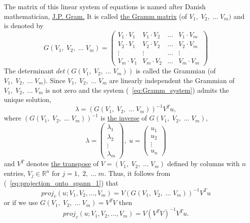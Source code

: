 \documentclass[color=black,11pt]{elegantpaper}
\begin{document}
The matrix of this linear system of equations is named after Danish mathematician, \href{https://en.wikipedia.org/wiki/J%C3%B8rgen_Pedersen_Gram}{J.P. Gram.} It is called \href{https://en.wikipedia.org/wiki/Gram_matrix}{the Gramm matrix} (of $V_1,\;V_2,\; \dots \; V_m)$ and is denoted by
$$
 G(V_1,\;V_2,\; \dots \; V_m) = \left(\begin{array}{cccc}
             V_1 \cdot V_1 & V_1 \cdot V_2 & \dots & V_1 \cdot V_m\\
             V_2 \cdot V_1 & V_2 \cdot V_2 & \dots & V_2 \cdot V_m\\
             \vdots & \vdots & \dots &\vdots \\
             V_m \cdot V_1 & V_m \cdot V_2 & \dots & V_m \cdot V_m
      \end{array}  \right)
$$
The determinant $det( G(V_1,\;V_2,\; \dots \; V_m))$ is called the Grammian (of $V_1,\;V_2,\; \dots \; V_m).$ Since $V_1,\;V_2,\; \dots \; V_m$ are linearly independent the Grammian of  $V_1,\;V_2,\; \dots \; V_m$ is not zero and the system (~\ref{eq:Gramm_system}) admits the unique solution,
$$
   \lambda = (G(V_1,\;V_2,\; \dots \; V_m))^{-1} V^T u,
$$ 
where $(G(V_1,\;V_2,\; \dots \; V_m))^{-1}$ is \href{https://en.wikipedia.org/wiki/Invertible_matrix}{the inverse} of $G(V_1,\;V_2,\; \dots \; V_m),$
$$
 \lambda = \left(\begin{array}{c}
                                \lambda_1\\
                                \lambda_2\\
                                  \vdots \\
                                \lambda_m
                                \end{array}
                          \right),\;
u = \left(\begin{array}{c}
                                u_1\\
                                u_2\\
                                  \vdots \\
                                u_n
                                \end{array}
                          \right)
$$
and $V^T$ denotes \href{https://en.wikipedia.org/wiki/Transpose}{the transpose} of $V = (V_1,\;V_2,\; \dots \; V_m)$ defined by columns with $n$ entries, $V_j \in \mathbb{R}^n$ for $j=1,\;2,\; \dots \; m.$  Thus, it follows from (~\ref{eq:projection_onto_spann_1}) that
$$
proj_v(u;V_1,V_2,\dots,V_m) = V (G(V_1,\;V_2,\; \dots \; V_m))^{-1} V^T u 
$$
or if we use $G(V_1,\;V_2,\; \dots \; V_m)=V^T V$ then
$$
proj_v(u;V_1,V_2,\dots,V_m) = V (V^T V)^{-1} V^T u .
$$
\end{document}
